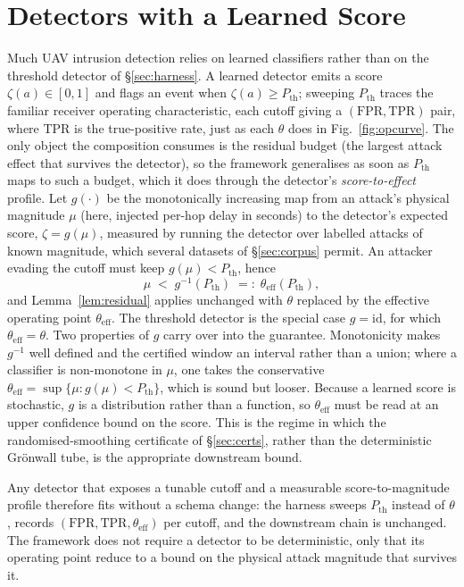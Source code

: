 \documentclass[conference,letterpaper,10pt]{IEEEtran}   %
\begin{document}
\section{Detectors with a Learned Score}
\label{app:learned}
\label{sec:roc}
Much UAV intrusion detection relies on learned classifiers rather than
on the threshold detector of \S\ref{sec:harness}. A learned detector emits a
score $\zeta(a)\in[0,1]$ and flags an event when $\zeta(a)\ge P_{\mathrm{th}}$;
sweeping $P_{\mathrm{th}}$ traces the familiar receiver operating
characteristic, each cutoff giving a $(\mathrm{FPR},\mathrm{TPR})$ pair, where
TPR is the true-positive rate, just as each $\theta$ does in Fig.~\ref{fig:opcurve}. The only object the composition
consumes is the residual budget (the largest attack effect that survives the
detector), so the framework generalises as soon as $P_{\mathrm{th}}$ maps to
such a budget, which it does through the detector's \emph{score-to-effect}
profile. Let $g(\cdot)$ be the monotonically increasing map from an attack's
physical magnitude $\mu$ (here, injected per-hop delay in seconds) to the
detector's expected score, $\zeta=g(\mu)$, measured by running the detector
over labelled attacks of known magnitude, which several datasets of
\S\ref{sec:corpus} permit. An attacker evading the cutoff must keep
$g(\mu)<P_{\mathrm{th}}$, hence
\begin{equation}
\label{eq:pth}
\mu \;<\; g^{-1}(P_{\mathrm{th}}) \;=:\; \theta_{\mathrm{eff}}(P_{\mathrm{th}}),
\end{equation}
and Lemma~\ref{lem:residual} applies unchanged with $\theta$ replaced by the
effective operating point $\theta_{\mathrm{eff}}$. The threshold detector is the
special case $g=\mathrm{id}$, for which $\theta_{\mathrm{eff}}=\theta$. Two
properties of $g$ carry over into the guarantee. Monotonicity makes $g^{-1}$
well defined and the certified window an interval rather than a union; where a
classifier is non-monotone in $\mu$, one takes the conservative
$\theta_{\mathrm{eff}}=\sup\{\mu: g(\mu)<P_{\mathrm{th}}\}$, which is sound but
looser. Because a learned score is stochastic, $g$ is a
distribution rather than a function, so $\theta_{\mathrm{eff}}$ must be read at
an upper confidence bound on the score. This is the regime in which the
randomised-smoothing certificate of \S\ref{sec:certs}, rather than the
deterministic Gr\"onwall tube, is the appropriate downstream bound.

Any detector that exposes a tunable cutoff and a measurable score-to-magnitude
profile therefore fits without a schema change: the harness sweeps
$P_{\mathrm{th}}$ instead of $\theta$, records
$(\mathrm{FPR},\mathrm{TPR},\theta_{\mathrm{eff}})$ per cutoff, and the
downstream chain is unchanged. The framework does not require a detector to be
deterministic, only that its operating point reduce to a bound on the physical
attack magnitude that survives it.
\end{document}
